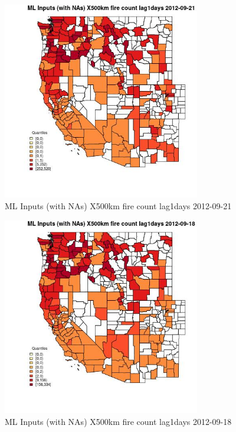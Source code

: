 \begin{figure} 
\centering  
\includegraphics[width=0.77\textwidth]{Code_Outputs/Report_ML_input_PM25_Step4_part_e_de_duplicated_aves_compiled_2019-05-14wNAs_CountyX500km_fire_count_lag1daysMean2012-09-21_2012-09-21.jpg} 
\caption{\label{fig:Report_ML_input_PM25_Step4_part_e_de_duplicated_aves_compiled_2019-05-14wNAsCountyX500km_fire_count_lag1daysMean2012-09-21_2012-09-21}ML Inputs (with NAs) X500km fire count lag1days 2012-09-21} 
\end{figure} 
 

\begin{figure} 
\centering  
\includegraphics[width=0.77\textwidth]{Code_Outputs/Report_ML_input_PM25_Step4_part_e_de_duplicated_aves_compiled_2019-05-14wNAs_CountyX500km_fire_count_lag1daysMean2012-09-18_2012-09-18.jpg} 
\caption{\label{fig:Report_ML_input_PM25_Step4_part_e_de_duplicated_aves_compiled_2019-05-14wNAsCountyX500km_fire_count_lag1daysMean2012-09-18_2012-09-18}ML Inputs (with NAs) X500km fire count lag1days 2012-09-18} 
\end{figure} 
 


